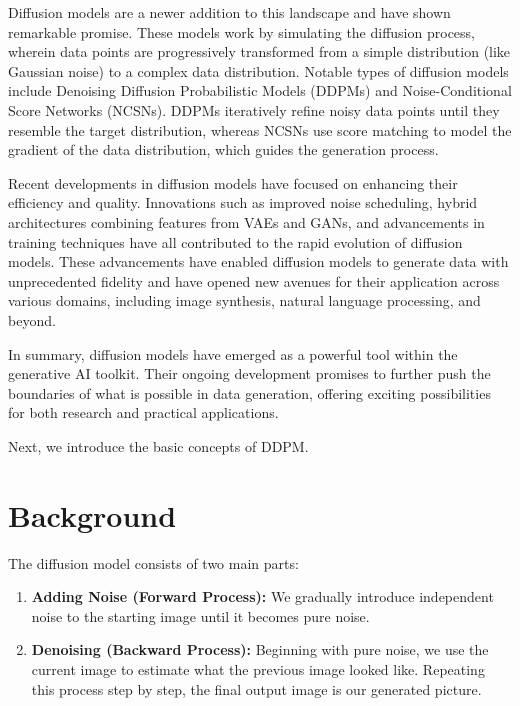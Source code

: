 \documentclass[
]{article}
\providecommand{\tightlist}{%
  \setlength{\itemsep}{0pt}\setlength{\parskip}{0pt}}\usepackage{longtable,booktabs,array}
\theoremstyle{remark}
\begin{document}
Diffusion models are a newer addition to this landscape and have shown
remarkable promise. These models work by simulating the diffusion
process, wherein data points are progressively transformed from a simple
distribution (like Gaussian noise) to a complex data distribution.
Notable types of diffusion models include Denoising Diffusion
Probabilistic Models (DDPMs) and Noise-Conditional Score Networks
(NCSNs). DDPMs iteratively refine noisy data points until they resemble
the target distribution, whereas NCSNs use score matching to model the
gradient of the data distribution, which guides the generation process.

Recent developments in diffusion models have focused on enhancing their
efficiency and quality. Innovations such as improved noise scheduling,
hybrid architectures combining features from VAEs and GANs, and
advancements in training techniques have all contributed to the rapid
evolution of diffusion models. These advancements have enabled diffusion
models to generate data with unprecedented fidelity and have opened new
avenues for their application across various domains, including image
synthesis, natural language processing, and beyond.

In summary, diffusion models have emerged as a powerful tool within the
generative AI toolkit. Their ongoing development promises to further
push the boundaries of what is possible in data generation, offering
exciting possibilities for both research and practical applications.

Next, we introduce the basic concepts of DDPM.

\section{Background}\label{background}

The diffusion model consists of two main parts:

\begin{enumerate}
\def\labelenumi{\arabic{enumi}.}
\tightlist
\item
  \textbf{Adding Noise (Forward Process):} We gradually introduce
  independent noise to the starting image until it becomes pure noise.
\item
  \textbf{Denoising (Backward Process):} Beginning with pure noise, we
  use the current image to estimate what the previous image looked like.
  Repeating this process step by step, the final output image is our
  generated picture.
\end{enumerate}
\end{document}
